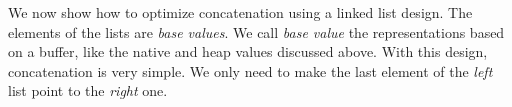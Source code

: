 \documentclass[twoside,11pt,a4paper]{article}
\begin{document}

We now show how to optimize concatenation using a linked list design. The elements of the lists are \textit{base values}. We call \textit{base value} the representations based on a buffer, like the native and heap values discussed above. With this design, concatenation is very simple. We only need to make the last element of the \textit{left} list point to the \textit{right} one. 
\end{document}
